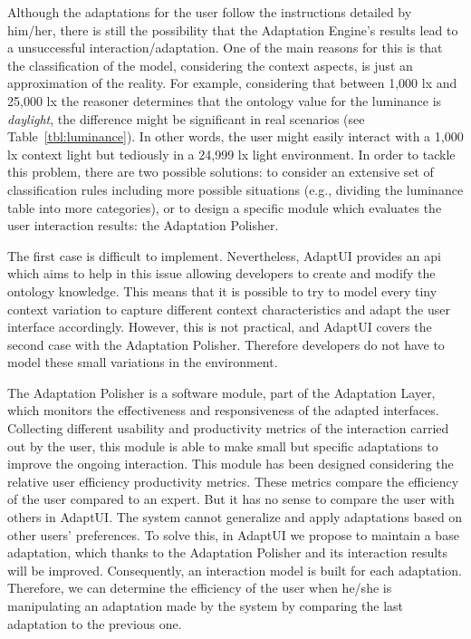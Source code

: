 Although the adaptations for the user follow the instructions detailed by him/her,
there is still the possibility that the Adaptation Engine's results lead to a
unsuccessful interaction/adaptation. One of the main reasons for this is that
the classification of the model, considering the context aspects, is just an
approximation of the reality. For example, considering that between 1,000 \ac{lx} and
25,000 \ac{lx} the reasoner determines that the ontology value for the luminance
is \textit{daylight}, the difference might be significant in real scenarios
(see Table~\ref{tbl:luminance}). In other words, the user might easily interact
with a 1,000 \ac{lx} context light but tediously in a 24,999 \ac{lx} light environment. In
order to tackle this problem, there are two possible solutions: to consider
an extensive set of classification rules including more possible situations (e.g.,
dividing the luminance table into more categories), or to design a specific
module which evaluates the user interaction results: the Adaptation Polisher.

The first case is difficult to implement. Nevertheless, AdaptUI provides an \ac{api}
which aims to help in this issue allowing developers to create and modify the
ontology knowledge. This means that it is possible to try to model every tiny
context variation to capture different context characteristics and adapt the user
interface accordingly. However, this is not practical, and AdaptUI covers the
second case with the Adaptation Polisher. Therefore developers do not have to
model these small variations in the environment.

The Adaptation Polisher is a software module, part of the Adaptation Layer, which
monitors the effectiveness and responsiveness of the adapted interfaces. Collecting
different usability and productivity metrics of the interaction carried out by the
user, this module is able to make small but specific adaptations to improve
the ongoing interaction. This module has been designed considering the relative
user efficiency productivity metrics. These metrics compare the efficiency of the
user compared to an expert. But it has no sense to compare the user with others
in AdaptUI. The system cannot generalize and apply adaptations based on other
users' preferences. To solve this, in AdaptUI we propose to maintain a base
adaptation, which thanks to the Adaptation Polisher and its interaction results
will be improved. Consequently, an interaction model is built for each adaptation.
Therefore, we can determine the efficiency of the user when he/she is manipulating
an adaptation made by the system by comparing the last adaptation to the previous
one.

